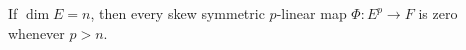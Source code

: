 If $\dim E = n$, then every skew symmetric $p$-linear map $\Phi: E^p \to F$ is zero whenever $p > n$.
